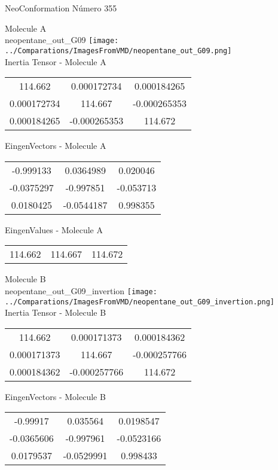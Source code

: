  \newpage

\vtab[-2cm]
\begin{center}
{\large NeoConformation \tab Número 355}
\end{center}
\begin{multicols}{2}
\begin{center}

Molecule A \\ 
neopentane\_out\_G09
\texttt{[image: ../Comparations/ImagesFromVMD/neopentane\_out\_G09.png]}
\\
Inertia Tensor - Molecule A \\
\vtab

\begin{tabular}{|c c c|}
114.662	 & 	0.000172734	 & 	0.000184265	 \\
0.000172734	 & 	114.667	 & 	-0.000265353	 \\
0.000184265	 & 	-0.000265353	 & 	114.672
\end{tabular}

\vtab
 EingenVectors - Molecule A     \\
\vtab
\begin{tabular}{|c c c|}
-0.999133	 & 	0.0364989	 & 	0.020046	 \\
-0.0375297	 & 	-0.997851	 & 	-0.053713	 \\
0.0180425	 & 	-0.0544187	 & 	0.998355
\end{tabular}

\vtab
 EingenValues - Molecule A     \\
\vtab
\begin{tabular}{|c c c|}
114.662	 & 	114.667	 & 	114.672	 \\
\end{tabular}
\columnbreak

Molecule B \\ 
neopentane\_out\_G09\_invertion
\texttt{[image: ../Comparations/ImagesFromVMD/neopentane\_out\_G09\_invertion.png]}
\\
Inertia Tensor - Molecule B \\
\vtab

\begin{tabular}{|c c c|}
114.662	 & 	0.000171373	 & 	0.000184362	 \\
0.000171373	 & 	114.667	 & 	-0.000257766	 \\
0.000184362	 & 	-0.000257766	 & 	114.672
\end{tabular}

\vtab
 EingenVectors - Molecule B     \\
\vtab
\begin{tabular}{|c c c|}
-0.99917	 & 	0.035564	 & 	0.0198547	 \\
-0.0365606	 & 	-0.997961	 & 	-0.0523166	 \\
0.0179537	 & 	-0.0529991	 & 	0.998433
\end{tabular}


\end{center}
\end{multicols}
